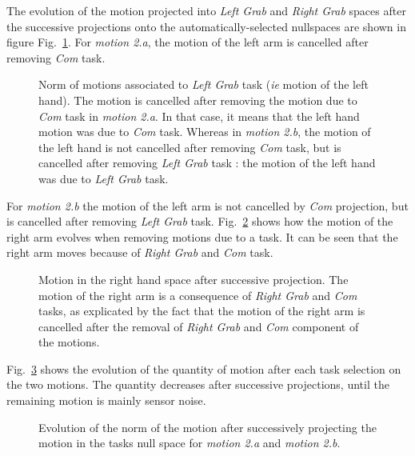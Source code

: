 \documentclass[journal]{IEEEtran}
\begin{document}
The evolution of the motion projected into \emph{Left Grab} and \emph{Right Grab}
spaces after the successive projections onto the automatically-selected nullspaces
are shown in figure Fig.~\ref{fig:exp1:Evolution2L}. For \emph{motion 2.a},
the motion of the left arm is cancelled after removing \emph{Com} task.
\begin{figure}[t]
  \centering
  \subfigure[Motion 2.a]{
  \resizebox{.48\textwidth}{!} {
  
  }                           
  \label{fig:exp1:Evolution2L:a}
  }
  \subfigure[Motion 2.b]{
  \resizebox{.48\textwidth}{!} {
  
  }
  \label{fig:exp1:Evolution2L:b}
  }
  \caption{Norm of motions associated to \emph{Left Grab} task (\emph{ie} motion of the left hand).
  The motion is cancelled after removing the motion due to \emph{Com} task
  in \emph{motion 2.a}. In that case, it means that the left hand motion was due to \emph{Com} task.
  Whereas in \emph{motion 2.b}, the motion of the left hand is not cancelled after
  removing \emph{Com} task, but is cancelled after removing
  \emph{Left Grab} task : the motion of the left hand was due
  to \emph{Left Grab} task.}
  \label{fig:exp1:Evolution2L}
\end{figure}
For \emph{motion 2.b} the motion of the left arm is
not cancelled by \emph{Com} projection, but is cancelled after
removing \emph{Left Grab} task.
Fig.~\ref{fig:exp1:Evolution2R} shows how the motion of the right arm evolves when removing
motions due to a task. It can be seen that the right arm moves because of \emph{Right Grab} and
\emph{Com} task.
\begin{figure}[t]
  \centering
  \subfigure[Motion 2.a]{
  \resizebox{.48\textwidth}{!} {
  
  }                           
  \label{fig:exp1:Evolution2R:a}
  }
  \subfigure[Motion 2.b]{
  \resizebox{.48\textwidth}{!} {
  
  }
  \label{fig:exp1:Evolution2R:b}
  }
  \caption{Motion in the right hand space after successive projection.
  The motion of the right arm is a consequence of 
  \emph{Right Grab} and \emph{Com} tasks, as explicated by the fact
  that the motion of the right arm is cancelled
  after the removal of \emph{Right Grab} and \emph{Com} component of the motions.}
  \label{fig:exp1:Evolution2R}
\end{figure}
Fig.~\ref{fig:exp1:PqdotNorms} shows the evolution of the quantity of motion after each task selection
on the two motions. The quantity decreases after successive projections, until the remaining motion 
is mainly sensor noise.
\begin{figure}[t]
  \centering
  \subfigure[Motion 2.a]{
  \resizebox{.48\textwidth}{!} {
    
  }
  \label{fig:exp1:PqdotNormsR}
  }
  \subfigure[Motion 2.b]{
  \resizebox{.48\textwidth}{!} {
    
  }
\label{fig:exp1:PqdotNormsRL}
}
\caption{Evolution of the norm of the motion after successively projecting the motion in the tasks null space for
\emph{motion 2.a} and \emph{motion 2.b}.}
\label{fig:exp1:PqdotNorms}
\end{figure}
\end{document}
